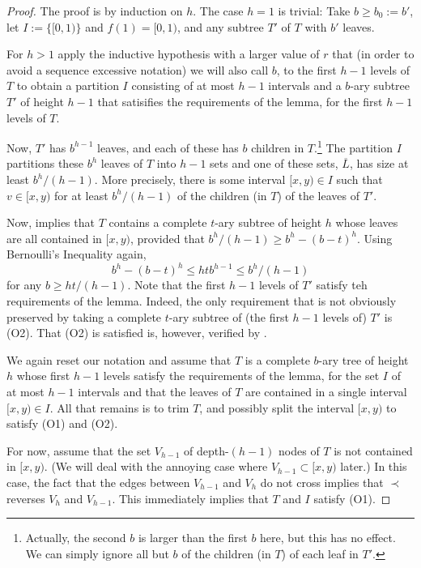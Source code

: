 \documentclass[kpfonts]{patmorin}
\begin{document}
\begin{proof}
  The proof is by induction on $h$.  The case $h=1$ is trivial: Take $b\ge b_0:=b'$, let $I:=\{[0,1)\}$ and $f(1)=[0,1)$, and any subtree $T'$ of $T$ with $b'$ leaves.
    
  For $h>1$ apply the inductive hypothesis with a larger value of $r$ that (in order to avoid a sequence excessive notation) we will also call $b$, to the first $h-1$ levels of $T$ to obtain a partition $I$ consisting of at most $h-1$ intervals and a $b$-ary subtree $T'$ of height $h-1$ that satisifies the requirements of the lemma, for the first $h-1$ levels of $T$.
  
  Now, $T'$ has $b^{h-1}$ leaves, and each of these has $b$ children in $T$.\footnote{Actually, the second $b$ is larger than the first $b$ here, but this has no effect.  We can simply ignore all but $b$ of the children (in $T$) of each leaf in $T'$.}  The partition $I$ partitions these $b^{h}$ leaves of $T$ into $h-1$ sets and one of these sets, $\overline{L}$, has size at least $b^{h}/(h-1)$. More precisely, there is some interval $[x,y)\in I$ such that $v\in [x,y)$ for at least $b^{h}/(h-1)$ of the children (in $T$) of the leaves of $T'$.
  
  Now,  implies that $T$ contains a complete $t$-ary subtree of height $h$ whose leaves are all contained in $[x,y)$, provided that $b^h/(h-1)\ge b^h- (b-t)^h$.  Using Bernoulli's Inequality again,
  \[
     b^h-(b-t)^h \le htb^{h-1} \le b^h/(h-1)
  \]
  for any $b\ge ht/(h-1)$.  Note that the first $h-1$ levels of $T'$ satisfy teh requirements of the lemma.  Indeed, the only requirement that is not obviously preserved by taking a complete $t$-ary subtree of (the first $h-1$ levels of) $T'$ is (O2). That (O2) is satisfied is, however, verified by .
  
  We again reset our notation and assume that $T$ is a complete $b$-ary tree of height $h$ whose first $h-1$ levels satisfy the requirements of the lemma, for the set $I$ of at most $h-1$ intervals and that the leaves of $T$ are contained in a single interval $[x,y)\in I$.  All that remains is to trim $T$, and possibly split the interval $[x,y)$ to satisfy (O1) and (O2).

  For now, assume that the set $V_{h-1}$ of depth-$(h-1)$ nodes of $T$ is not contained in $[x,y)$.  (We will deal with the annoying case where $V_{h-1}\subset [x,y)$ later.)  In this case, the fact that the edges between $V_{h-1}$ and $V_h$ do not cross implies that $\prec$ reverses $V_h$ and $V_{h-1}$.  This immediately implies that $T$ and $I$ satisfy (O1).
  

\end{proof}
\end{document}
